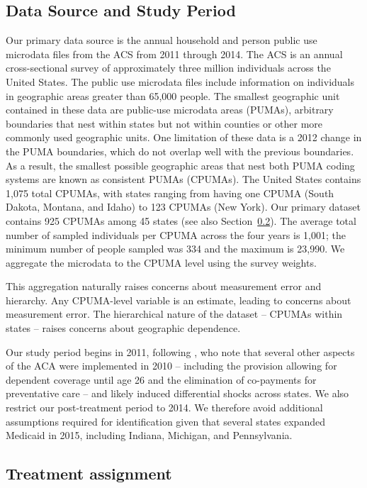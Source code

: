 \documentclass[aoas]{imsart}
\theoremstyle{plain}
\theoremstyle{remark}
\begin{document}
\subsection{Data Source and Study Period}\label{ssec:data}

Our primary data source is the annual household and person public use microdata files from the ACS from 2011 through 2014. The ACS is an annual cross-sectional survey of approximately three million individuals across the United States. The public use microdata files include information on individuals in geographic areas greater than 65,000 people. The smallest geographic unit contained in these data are public-use microdata areas (PUMAs), arbitrary boundaries that nest within states but not within counties or other more commonly used geographic units. One limitation of these data is a 2012 change in the PUMA boundaries, which do not overlap well with the previous boundaries. As a result, the smallest possible geographic areas that nest both PUMA coding systems are known as consistent PUMAs (CPUMAs). The United States contains 1,075 total CPUMAs, with states ranging from having one CPUMA (South Dakota, Montana, and Idaho) to 123 CPUMAs (New York). Our primary dataset contains 925 CPUMAs among 45 states (see also Section~\ref{sssec:txassign}). The average total number of sampled individuals per CPUMA across the four years is 1,001; the minimum number of people sampled was 334 and the maximum is 23,990. We aggregate the microdata to the CPUMA level using the survey weights.  

This aggregation naturally raises concerns about measurement error and hierarchy. Any CPUMA-level variable is an estimate, leading to concerns about measurement error. The hierarchical nature of the dataset -- CPUMAs within states -- raises concerns about geographic dependence.

Our study period begins in 2011, following \cite{courtemanche2017early}, who note that several other aspects of the ACA were implemented in 2010 -- including the provision allowing for dependent coverage until age 26 and the elimination of co-payments for preventative care -- and likely induced differential shocks across states. We also restrict our post-treatment period to 2014. We therefore avoid additional assumptions required for identification given that several states expanded Medicaid in 2015, including Indiana, Michigan, and Pennsylvania.

\subsection{Treatment assignment} \label{sssec:txassign}
\end{document}
